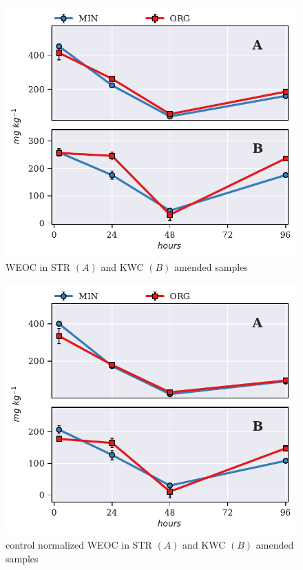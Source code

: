 \documentclass[12pt]{report}
\begin{document}
		 \begin{figure}[H]
			\centering
			\includegraphics[scale=1]{thesis_figures/preliminary/treated/WEOC.pdf}
			\caption{WEOC in STR $\left(A\right)$ and KWC $\left(B\right)$ amended   samples}
			\label{fig:weoc_treated_preliminary}
		\end{figure}
		
		\begin{figure}[H]
			\centering
			\includegraphics[scale=1]{thesis_figures/preliminary/control_normalized/WEOC.pdf}
			\caption{control normalized WEOC in STR $\left(A\right)$ and KWC $\left(B\right)$ amended   samples}
			\label{fig:nor_weoc_treated_preliminary}
		\end{figure}
		
\end{document}
